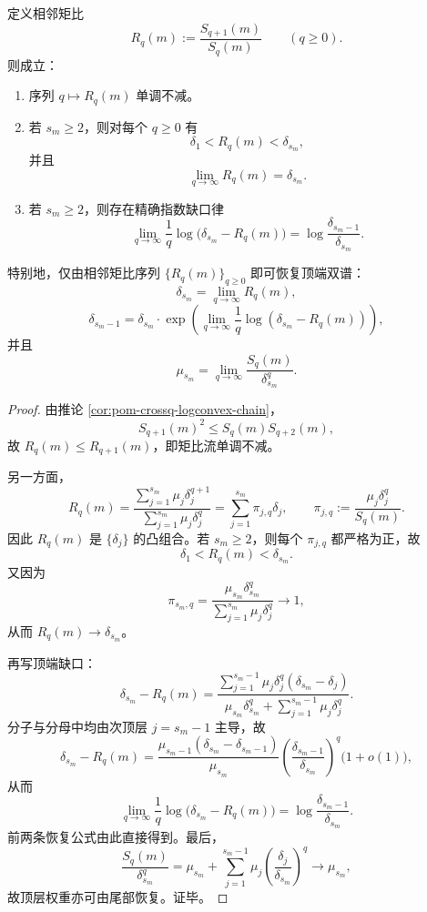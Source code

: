 \begin{theorem}[连续矩比流的顶端谱恢复与次顶端缺口律]\label{thm:conclusion-fixedresolution-moment-ratio-topgap}
定义相邻矩比
\[
R_q(m):=\frac{S_{q+1}(m)}{S_q(m)}
\qquad(q\ge 0).
\]
则成立：
\begin{enumerate}
  \item 序列 \(q\mapsto R_q(m)\) 单调不减。

  \item 若 \(s_m\ge 2\)，则对每个 \(q\ge 0\) 有
  \[
  \delta_1<R_q(m)<\delta_{s_m},
  \]
  并且
  \[
  \lim_{q\to\infty}R_q(m)=\delta_{s_m}.
  \]

  \item 若 \(s_m\ge 2\)，则存在精确指数缺口律
  \[
  \lim_{q\to\infty}\frac1q\log\bigl(\delta_{s_m}-R_q(m)\bigr)
  =
  \log\frac{\delta_{s_m-1}}{\delta_{s_m}}.
  \]
\end{enumerate}
特别地，仅由相邻矩比序列 \(\{R_q(m)\}_{q\ge 0}\) 即可恢复顶端双谱：
\[
\delta_{s_m}=\lim_{q\to\infty}R_q(m),
\]
\[
\delta_{s_m-1}
=
\delta_{s_m}\cdot
\exp\!\left(
\lim_{q\to\infty}\frac1q\log(\delta_{s_m}-R_q(m))
\right),
\]
并且
\[
\mu_{s_m}
=
\lim_{q\to\infty}\frac{S_q(m)}{\delta_{s_m}^q}.
\]
\end{theorem}
\begin{proof}
由推论 \ref{cor:pom-crossq-logconvex-chain}，
\[
S_{q+1}(m)^2\le S_q(m)S_{q+2}(m),
\]
故 \(R_q(m)\le R_{q+1}(m)\)，即矩比流单调不减。

另一方面，
\[
R_q(m)
=
\frac{\sum_{j=1}^{s_m}\mu_j\delta_j^{q+1}}{\sum_{j=1}^{s_m}\mu_j\delta_j^q}
=
\sum_{j=1}^{s_m}\pi_{j,q}\delta_j,
\qquad
\pi_{j,q}:=\frac{\mu_j\delta_j^q}{S_q(m)}.
\]
因此 \(R_q(m)\) 是 \(\{\delta_j\}\) 的凸组合。若 \(s_m\ge 2\)，则每个 \(\pi_{j,q}\) 都严格为正，故
\[
\delta_1<R_q(m)<\delta_{s_m}.
\]
又因为
\[
\pi_{s_m,q}
=
\frac{\mu_{s_m}\delta_{s_m}^q}{\sum_{j=1}^{s_m}\mu_j\delta_j^q}
\longrightarrow 1,
\]
从而 \(R_q(m)\to \delta_{s_m}\)。

再写顶端缺口：
\[
\delta_{s_m}-R_q(m)
=
\frac{\sum_{j=1}^{s_m-1}\mu_j\delta_j^q(\delta_{s_m}-\delta_j)}
{\mu_{s_m}\delta_{s_m}^q+\sum_{j=1}^{s_m-1}\mu_j\delta_j^q}.
\]
分子与分母中均由次顶层 \(j=s_m-1\) 主导，故
\[
\delta_{s_m}-R_q(m)
=
\frac{\mu_{s_m-1}(\delta_{s_m}-\delta_{s_m-1})}{\mu_{s_m}}
\left(\frac{\delta_{s_m-1}}{\delta_{s_m}}\right)^q
\bigl(1+o(1)\bigr),
\]
从而
\[
\lim_{q\to\infty}\frac1q\log\bigl(\delta_{s_m}-R_q(m)\bigr)
=
\log\frac{\delta_{s_m-1}}{\delta_{s_m}}.
\]
前两条恢复公式由此直接得到。最后，
\[
\frac{S_q(m)}{\delta_{s_m}^q}
=
\mu_{s_m}+\sum_{j=1}^{s_m-1}\mu_j\left(\frac{\delta_j}{\delta_{s_m}}\right)^q
\longrightarrow \mu_{s_m},
\]
故顶层权重亦可由尾部恢复。证毕。
\end{proof}

